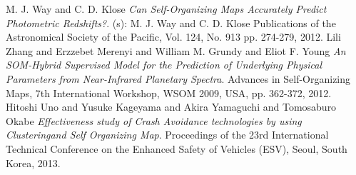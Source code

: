 \documentclass[hyperref={pdfpagelabels=true}]{beamer}
\begin{document}
\begin{frame}[allowframebreaks]
{\begin{thebibliography}{ab}
   M. J. Way and C. D. Klose {\em Can Self-Organizing Maps Accurately Predict Photometric Redshifts?}. (s): M. J. Way and C. D. Klose
 Publications of the Astronomical Society of the Pacific, Vol. 124, No. 913 pp. 274-279, 2012.
   Lili Zhang and Erzzebet Merenyi and William M. Grundy and Eliot F. Young {\em An SOM-Hybrid Supervised Model for the Prediction of Underlying Physical Parameters from Near-Infrared Planetary Spectra}. Advances in Self-Organizing Maps, 7th International Workshop, WSOM 2009, USA, pp. 362-372, 2012.
   Hitoshi Uno and Yusuke Kageyama and Akira Yamaguchi and Tomosaburo Okabe {\em Effectiveness study of Crash Avoidance technologies by using Clusteringand Self Organizing Map}. Proceedings of the 23rd International Technical Conference on the Enhanced Safety of Vehicles (ESV), Seoul, South Korea, 2013.
  \end{thebibliography}
 }
\end{frame}
\end{document}
